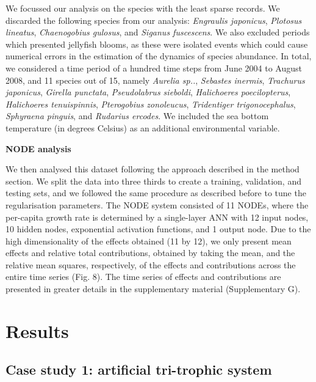\documentclass[11pt, oneside]{article}
\begin{document}
We focussed our analysis on the species with the least sparse records.
We discarded the following species from our analysis: \textit{Engraulis japonicus}, \textit{Plotosus lineatus}, \textit{Chaenogobius gulosus}, and \textit{Siganus fuscescens}.
We also excluded periods which presented jellyfish blooms, as these were isolated events which could cause numerical errors in the estimation of the dynamics of species abundance.
In total, we considered a time period of a hundred time steps from June 2004 to August 2008, and 11 species out of 15, namely \textit{Aurelia sp..}, \textit{Sebastes inermis}, \textit{Trachurus japonicus}, \textit{Girella punctata}, \textit{Pseudolabrus sieboldi}, \textit{Halichoeres poecilopterus}, \textit{Halichoeres tenuispinnis}, \textit{Pterogobius zonoleucus}, \textit{Tridentiger trigonocephalus}, \textit{Sphyraena pinguis}, and \textit{Rudarius ercodes}.
We included the sea bottom temperature (in degrees Celsius) as an additional environmental variable.

\textbf{NODE analysis}

We then analysed this dataset following the approach described in the method section. 
We split the data into three thirds to create a training, validation, and testing sets, and we followed the same procedure as described before to tune the regularisation parameters.
The NODE system consisted of 11 NODEs, where the per-capita growth rate is determined by a single-layer ANN with 12 input nodes, 10 hidden nodes, exponential activation functions, and 1 output node.
Due to the high dimensionality of the effects obtained (11 by 12), we only present mean effects and relative total contributions, obtained by taking the mean, and the relative mean squares, respectively, of the effects and contributions across the entire time series (Fig. 8).
The time series of effects and contributions are presented in greater details in the supplementary material (Supplementary G).

\section{Results}

\subsection{Case study 1: artificial tri-trophic system}
\end{document}
